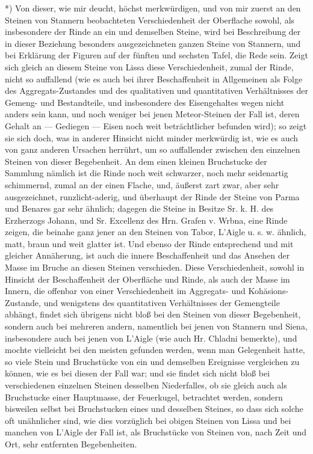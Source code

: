 \documentclass[a4paper, 11pt, oneside, german]{article}
\begin{document}
*) Von dieser, wie mir deucht, höchst merkwürdigen, und von mir zuerst an den Steinen von Stannern beobachteten Verschiedenheit der Oberflache sowohl, als insbesondere der Rinde an ein und demselben Steine, wird bei Beschreibung der in dieser Beziehung besonders ausgezeichneten ganzen Steine von Stannern, und bei Erklärung der Figuren auf der fünften und sechsten Tafel, die Rede sein. Zeigt sich gleich an diesem Steine von Lissa diese Verschiedenheit, zumal der Rinde, nicht so auffallend (wie es auch bei ihrer Beschaffenheit in Allgemeinen als Folge des Aggregats-Zustandes und des qualitativen und quantitativen Verhältnisses der Gemeng- und Bestandteile, und insbesondere des Eisengehaltes wegen nicht anders sein kann, und noch weniger bei jenen Meteor-Steinen der Fall ist, deren Gehalt an --- Gediegen --- Eisen noch weit beträchtlicher befunden wird); so zeigt sie sich doch, was in anderer Hinsicht nicht minder merkwürdig ist, wie es auch von ganz anderen Ursachen herrührt, um so auffallender zwischen den einzelnen Steinen von dieser Begebenheit. An dem einen kleinen Bruchstucke der Sammlung nämlich ist die Rinde noch weit schwarzer, noch mehr seidenartig schimmernd, zumal an der einen Flache, und, äußerst zart zwar, aber sehr ausgezeichnet, runzlicht-aderig, und überhaupt der Rinde der Steine von Parma und Benares gar sehr ähnlich; dagegen die Steine in Besitze Sr. k. H. des Erzherzogs Johann, und Sr. Excellenz des Hrn. Grafen v. Wrbna, eine Rinde zeigen, die beinahe ganz jener an den Steinen von Tabor, L'Aigle u. s. w. ähnlich, matt, braun und weit glatter ist. Und ebenso der Rinde entsprechend und mit gleicher Annäherung, ist auch die innere Beschaffenheit und das Ansehen der Masse im Bruche an diesen Steinen verschieden. Diese Verschiedenheit, sowohl in Hinsicht der Beschaffenheit der Oberfläche und Rinde, als auch der Masse im Innern, die offenbar von einer Verschiedenheit im Aggregats- und Kohäsions-Zustande, und wenigstens des quantitativen Verhältnisses der Gemengteile abhängt, findet sich übrigens nicht bloß bei den Steinen von dieser Begebenheit, sondern auch bei mehreren andern, namentlich bei jenen von Stannern und Siena, insbesondere auch bei jenen von L'Aigle (wie auch Hr. Chladni bemerkte), und mochte vielleicht bei den meisten gefunden werden, wenn man Gelegenheit hatte, so viele Stein und Bruchstücke von ein und demselben Ereignisse vergleichen zu können, wie es bei diesen der Fall war; und sie findet sich nicht bloß bei verschiedenen einzelnen Steinen desselben Niederfalles, ob sie gleich auch als Bruchstucke einer Hauptmasse, der Feuerkugel, betrachtet werden, sondern bisweilen selbst bei Bruchstucken eines und desselben Steines, so dass sich solche oft unähnlicher sind, wie dies vorzüglich bei obigen Steinen von Lissa und bei manchen von L'Aigle der Fall ist, als Bruchstücke von Steinen von, nach Zeit und Ort, sehr entfernten Begebenheiten.
\end{document}
